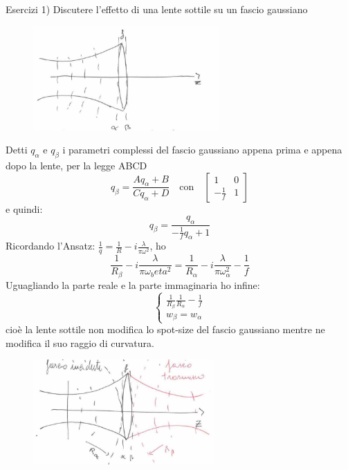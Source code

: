 \documentclass{book}
\def \w {\omega}
\def \l {\lambda}
\theoremstyle{remark}
\begin{document}
Esercizi
1) Discutere l'effetto di una lente sottile su un fascio gaussiano
\begin{figure}[H]
\centering
\includegraphics[height=4cm]{images/1}
\end{figure}
Detti $q_\alpha$ e $q_\beta$ i parametri complessi del fascio gaussiano appena prima e appena dopo la lente, per la legge ABCD
\begin{equation*}
q_\beta = \frac{Aq_\alpha + B}{Cq_\alpha + D} \quad \text{con} \quad
\begin{bmatrix}
1	&	0\\
-\frac{1}{f}	&	1
\end{bmatrix}
\end{equation*}
e quindi:
\begin{equation*}
q_\beta = \frac{q_\alpha}{-\frac{1}{f}q_\alpha + 1}
\end{equation*}
Ricordando l'Ansatz: $\frac{1}{q} = \frac{1}{R} -i\frac{\l}{\pi \w^2}$, ho
\begin{equation*}
\frac{1}{R_\beta} -i\frac{\l}{\pi\omega_beta^2} = \frac{1}{R_\alpha} -i\frac{\l}{\pi \omega_\alpha^2} - \frac{1}{f}
\end{equation*}
Uguagliando la parte reale e la parte immaginaria ho infine:
\begin{equation*}
\begin{cases}
\frac{1}{R_\beta} \frac{1}{R_\alpha} - \frac{1}{f}\\
w_\beta = w_\alpha
\end{cases}
\end{equation*}
cioè la lente sottile non modifica lo spot-size del fascio gaussiano mentre ne modifica il suo raggio di curvatura.
\begin{figure}[H]
\centering
\includegraphics[height=4cm]{images/2}
\end{figure}
\end{document}
